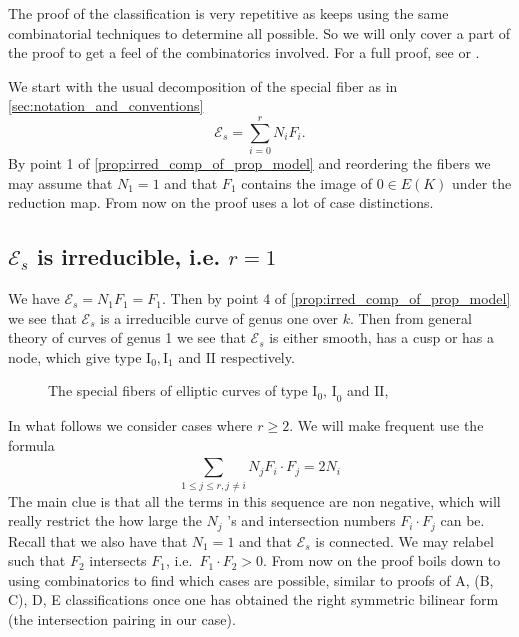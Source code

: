 
The proof of the classification is very repetitive as keeps using the same combinatorial techniques to determine all possible. 
So we will only cover a part of the proof to get a feel of the combinatorics involved. 
For a full proof, see \cite[sec.\ IV.8]{silvermanAdvancedTopicsArithmetic1994} or \cite[sec.\ 10.2.1]{liuAlgebraicGeometryArithmetic2002}.

\medskip 
We start with the usual decomposition of the special fiber as in \cref{sec:notation_and_conventions}  \[
	\mathscr E_s = \sum_{i = 0}^{r} N_i F_i
.\]  
By point 1 of \cref{prop:irred_comp_of_prop_model} and reordering the fibers we may assume that $N_1 = 1$ and that $F_1$ contains the image of $0 \in E (K)$ under the reduction map. 
From now on the proof uses a lot of case distinctions. 
\subsection{$\mathscr E _s$ is irreducible, i.e. $r = 1$} \label{sec:C_s_is_irreducible,_i.e._r_=_1}
We have $\mathscr E _s = N_1 F_1 = F_1$. Then by point 4 of \cref{prop:irred_comp_of_prop_model} we see that  $\mathscr E_s$ is a irreducible curve of genus one over $k$. 
Then from general theory of curves of genus 1 we see that $\mathscr E _s$ is either smooth, has a cusp or has a node, which give type $\text{I}_0, \text{I}_1$ and $\text{II}$ respectively.  

\begin{figure}[ht]
    \centering
    \caption{The special fibers of elliptic curves of type $\text{I}_0 \text{, I}_0$ and $\text{II}$,}
    \label{fig:type-i2-iii}
\end{figure}

\bigskip
In what follows we consider cases where $r \ge 2$. We will make frequent use the formula 
\begin{equation}\label{eq:sum_intersections}
	\sum_{1 \le j \le r, j \ne i}^{} N_j F_i \cdot F_j = 2 N_i
\end{equation}
The main clue is that all the terms in this sequence are non negative, which will really restrict the how large the $N_j$ 's and intersection numbers  $F_i \cdot  F_j$ can be.
Recall that we also have that $N_1 = 1$ and that $\mathscr E _s$ is connected. We may relabel such that $F_2$ intersects $F_1$, i.e.\  $F_1 \cdot F_2 > 0$.  
From now on the proof boils down to using combinatorics to find which cases are possible, similar to proofs of A, (B, C), D, E classifications once one has obtained the right symmetric bilinear form (the intersection pairing in our case).  



